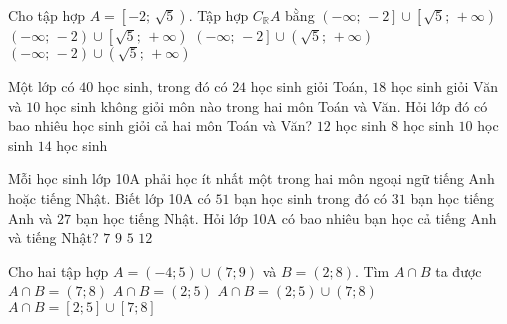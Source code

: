 \begin{ex}%
	Cho tập hợp $A=\left[ -2;\,\sqrt{5} \right)$. Tập hợp $C_{\mathbb{R}}A$ bằng
	\choice
	{$\left( -\infty ;\,-2 \right]\cup \left[ \sqrt{5};\,+\infty \right)$}
	{\True $\left( -\infty ;\,-2 \right)\cup \left[ \sqrt{5};\,+\infty \right)$}
	{$\left( -\infty ;\,-2 \right]\cup \left( \sqrt{5};\,+\infty \right)$}
	{$\left( -\infty ;\,-2 \right)\cup \left( \sqrt{5};\,+\infty \right)$}
	\loigiai{
		Ta có $C_{\mathbb{R}}A=\Bbb{R}\setminus A=\left( -\infty ;\,-2 \right)\cup \left[ \sqrt{5};\,+\infty \right).$
	}
\end{ex}
\begin{ex}%
	Một lớp có $40$ học sinh, trong đó có $24$ học sinh giỏi Toán, $18$ học sinh giỏi Văn và $10$ học
	sinh không giỏi môn nào trong hai môn Toán và Văn. Hỏi lớp đó có bao nhiêu học sinh giỏi cả hai môn
	Toán và Văn?
	\choice
	{\True $12$ học sinh}
	{$8$ học sinh}
	{$10$ học sinh}
	{$14$ học sinh}
\end{ex}
\begin{ex}%
	Mỗi học sinh lớp 10A phải học ít nhất một trong hai môn ngoại ngữ tiếng Anh hoặc tiếng Nhật. Biết lớp 10A có $51$ bạn học sinh trong đó có $31$ bạn học tiếng Anh và $27$ bạn học tiếng Nhật. Hỏi lớp 10A có bao nhiêu bạn học cả tiếng Anh và tiếng Nhật?
	\choice
	{\True $7$}
	{$9$}
	{$5$}
	{$12$}
\end{ex}
\begin{ex}%
	Cho hai tập hợp $A=(-4;5) \cup (7;9)$ và $B=(2;8)$. Tìm $A\cap B$ ta được
	\choice
	{$A \cap B=(7;8)$}
	{$A \cap B=(2;5)$}
	{\True $A \cap B=(2;5) \cup (7;8)$}
	{$A \cap B=[2;5] \cup [7;8]$}
\end{ex}

